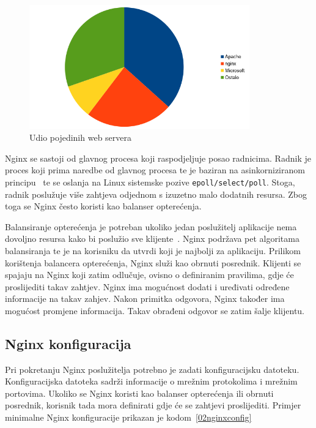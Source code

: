 \begin{figure}[h]
    \centering
    \includegraphics[width=0.85\textwidth]{img/02/nginx_ratio.png}
    \caption{Udio pojedinih web servera}%
    \label{fig:02nginx_ratio}
\end{figure}

Nginx se sastoji od glavnog procesa koji raspodjeljuje posao radnicima. Radnik je proces koji prima
naredbe od glavnog procesa te je baziran na asinkorniziranom principu~\citep{reese2008nginx} te se
oslanja na Linux sistemske pozive \texttt{epoll/select/poll}. Stoga, radnik poslužuje više zahtjeva
odjednom s izuzetno malo dodatnih resursa. Zbog toga se Nginx često koristi kao balanser
opterećenja.

Balansiranje opterećenja je potreban ukoliko jedan poslužitelj aplikacije nema dovoljno resursa kako
bi poslužio sve klijente~\citep{soni2016load}. Nginx podržava pet algoritama balansiranja te je na
korisniku da utvrdi koji je najbolji za aplikaciju. Prilikom korištenja balancera opterećenja, Nginx
služi kao obrnuti posrednik. Klijenti se spajaju na Nginx koji zatim odlučuje, ovisno o definiranim
pravilima, gdje će proslijediti takav zahtjev. Nginx ima mogućnost dodati i uređivati određene
informacije na takav zahjev. Nakon primitka odgovora, Nginx također ima mogućost promjene
informacija. Takav obrađeni odgovor se zatim šalje klijentu.

\subsection{Nginx konfiguracija}
Pri pokretanju Nginx poslužitelja potrebno je zadati konfiguracijsku datoteku. Konfiguracijska
datoteka sadrži informacije o mrežnim protokolima i mrežnim portovima. Ukoliko se Nginx koristi kao
balanser opterećenja ili obrnuti posrednik, korisnik tada mora definirati gdje će se zahtjevi
proslijediti. Primjer minimalne Nginx konfiguracije prikazan je kodom~\ref{02nginxconfig}

